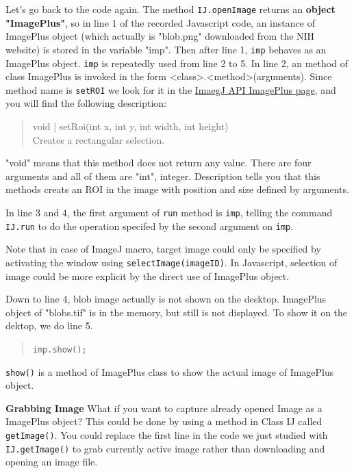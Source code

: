 \documentclass[11pt,a4paper,oneside]{report}
\newcommand{\ijmenu}[1]{\texttt{\small#1}}
\newcommand{\ilcom}[1]{\texttt{\small#1}}
\begin{document}
Let's go back to the code again. The method \ilcom{IJ.openImage} returns an \textbf{object "ImagePlus"}, so in line 1 of the recorded Javascript code, an instance of ImagePlus object (which actually is "blob.png" downloaded from the NIH website) is stored in the variable "imp". Then after line 1, \ilcom{imp} behaves as an ImagePlus object. \ilcom{imp} is repeatedly used from line 2 to 5. In line 2, an method of class ImagePlus is invoked in the form <class>.<method>(arguments). Since method name is \ilcom{setROI} we look for it in the \href{http://rsb.info.nih.gov/ij/developer/api/ij/ImagePlus.html}{ImaegJ API ImagePlus page}, and you will find the following description:

\begin{quote}
void | setRoi(int x, int y, int width, int height) \\
          Creates a rectangular selection.
\end{quote}

"void" means that this method does not return any value. There are four arguments and all of them are "int", integer. Description tells you that this methods creats an ROI in the image with position and size defined by arguments.  

In line 3 and 4, the first argument of \ilcom{run} method is \ilcom{imp}, telling the command \ilcom{IJ.run} to do the operation specifed by the second argument on \ilcom{imp}. 

Note that in case of ImageJ macro, target image could only be specified by activating the window using \ilcom{selectImage(imageID)}. In Javascript, selection of image could be more explicit by the direct use of ImagePlus object.  

Down to line 4, blob image actually is not shown on the desktop.  ImagePlus object of "blobs.tif" is in the memory, but still is not displayed. To show it on the dektop, we do line 5. 

\begin{quote}
\ilcom{imp.show();}
\end{quote}

\ilcom{show()} is a method of ImagePlus class to show the actual image of ImagePlus object. 


\textbf{Grabbing Image}
What if you want to capture already opened Image as a ImagePlus object? This could be done by using a method in Class IJ called \ilcom{getImage()}. You could replace the first line in the code we just studied with \ilcom{IJ.getImage()} to grab currently active image rather than downloading and opening an image file. 
\end{document}
